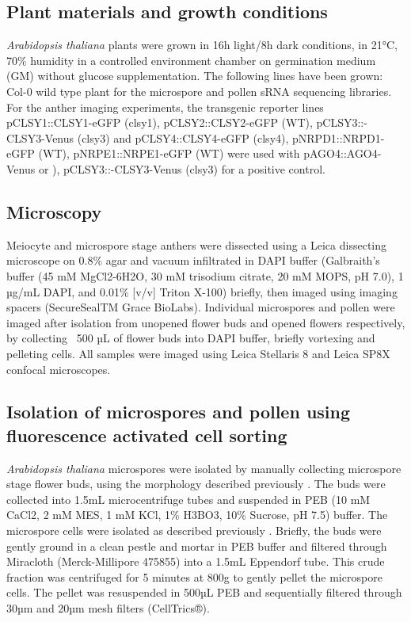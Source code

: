 \subsection{Plant materials and growth conditions}

\textit{Arabidopsis thaliana} plants were grown in 16h light/8h dark conditions, in 21°C, 70\% humidity in a controlled environment chamber on germination medium (GM) without glucose supplementation. The following lines have been grown: Col-0 wild type plant for the microspore and pollen sRNA sequencing libraries. For the anther imaging experiments, the transgenic reporter lines pCLSY1::CLSY1-eGFP (clsy1), pCLSY2::CLSY2-eGFP (WT), pCLSY3::-CLSY3-Venus (clsy3) and pCLSY4::CLSY4-eGFP (clsy4), pNRPD1::NRPD1-eGFP (WT), pNRPE1::NRPE1-eGFP (WT) were used with pAGO4::AGO4-Venus or ), pCLSY3::-CLSY3-Venus (clsy3) for a positive control.

\subsection{Microscopy}

Meiocyte and microspore stage anthers were dissected using a Leica dissecting microscope on 0.8\% agar and vacuum infiltrated in DAPI buffer (Galbraith’s buffer (45 mM MgCl2-6H2O, 30 mM trisodium citrate, 20 mM MOPS, pH 7.0), 1 µg/mL DAPI, and 0.01\% [v/v] Triton X-100) briefly, then imaged using imaging spacers (SecureSealTM Grace BioLabs). Individual microspores and pollen were imaged after isolation from unopened flower buds and opened flowers respectively, by collecting ~500 µL of flower buds into DAPI buffer, briefly vortexing and pelleting cells. All samples were imaged using Leica Stellaris 8 and Leica SP8X confocal microscopes.

\subsection{Isolation of microspores and pollen using fluorescence activated cell sorting}

\textit{Arabidopsis thaliana} microspores were isolated by manually collecting microspore stage flower buds, using the morphology described previously \citep{RN86}. The buds were collected into 1.5mL microcentrifuge tubes and suspended in PEB (10 mM CaCl2, 2 mM MES, 1 mM KCl, 1\% H3BO3, 10\% Sucrose, pH 7.5) buffer. The microspore cells were isolated as described previously \citep{RN140}. Briefly, the buds were gently ground in a clean pestle and mortar in PEB buffer and filtered through Miracloth (Merck-Millipore 475855) into a 1.5mL Eppendorf tube. This crude fraction was centrifuged for 5 minutes at 800g to gently pellet the microspore cells. The pellet was resuspended in 500µL PEB and sequentially filtered through 30µm and 20µm mesh filters (CellTrics®).

